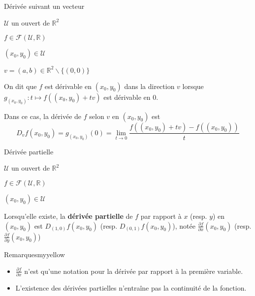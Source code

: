     \begin{defi}{Dérivée suivant un vecteur}{}
        \begin{soient}
            \item $\mathcal{U}$ un ouvert de $\mathbb{R}^2$
            \item $f \in \mathcal{F}(\mathcal{U},\mathbb{R})$
            \item $(x_0,y_0) \in \mathcal{U}$
            \item $v = (a,b) \in \mathbb{R}^2 \backslash \{ (0,0) \}$
        \end{soient}
        On dit que $f$ est dérivable en $(x_0,y_0)$ dans la direction $v$ lorsque $g_{(x_0,y_0)} : t \mapsto f((x_0,y_0)+tv)$ est dérivable en 0. 
        
        Dans ce cas, la dérivée de $f$ selon $v$ en $(x_0,y_0)$ est 
        \[D_v f(x_0,y_0) = g_{(x_0,y_0)}(0) = \lim\limits_{t \rightarrow 0} \frac{f((x_0,y_0)+tv) - f((x_0,y_0))}{t} \]
    \end{defi}

    \begin{defi}{Dérivée partielle}{}
        \begin{soient}
            \item $\mathcal{U}$ un ouvert de $\mathbb{R}^2$
            \item $f \in \mathcal{F}(\mathcal{U},\mathbb{R})$
            \item $(x_0,y_0) \in \mathcal{U}$
        \end{soient}
        Lorsqu’elle existe, la \textbf{dérivée partielle} de $f$ par rapport à $x$ (resp. $y$) en $(x_0,y_0)$ est $D_{(1,0)}f(x_0,y_0)$ (resp. $D_{(0,1)}f(x_0,y_0)$), notée $\frac{\partial f}{\partial x}(x_0,y_0)$ (resp. $\frac{\partial f}{\partial y}(x_0,y_0)$)
    \end{defi}

    \begin{omed}{Remarques}{myyellow}
        \begin{itemize}
            \item $\frac{\partial f}{\partial x}$ n’est qu’une notation pour la dérivée par rapport à la première variable.
            \item L’existence des dérivées partielles n’entraîne pas la continuité de la fonction.
        \end{itemize}
    \end{omed}


